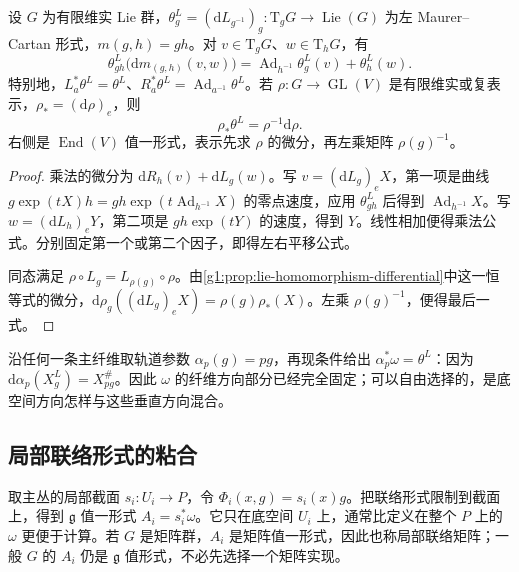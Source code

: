 \begin{proposition}\label{g1:prop:maurer-cartan-product}
	设 \(G\) 为有限维实 Lie 群，\(\theta^L_g=(\mathrm{d}L_{g^{-1}})_g:\mathrm{T}_gG\to\operatorname{Lie}(G)\) 为左 Maurer--Cartan 形式，\(m(g,h)=gh\)。对 \(v\in \mathrm{T}_gG\)、\(w\in \mathrm{T}_hG\)，有
	\begin{equation}\label{g1:eq:maurer-cartan-product}
		\theta^L_{gh}\bigl(\mathrm{d}m_{(g,h)}(v,w)\bigr)
		=\operatorname{Ad}_{h^{-1}}\theta^L_g(v)+\theta^L_h(w).
	\end{equation}
	特别地，\(L_a^*\theta^L=\theta^L\)、\(R_a^*\theta^L=\operatorname{Ad}_{a^{-1}}\theta^L\)。若 \(\rho:G\to\operatorname{GL}(V)\) 是有限维实或复表示，\(\rho_*=(\mathrm{d}\rho)_e\)，则
	\begin{equation}\label{g1:eq:maurer-cartan-representation}
		\rho_*\theta^L=\rho^{-1}\mathrm{d}\rho.
	\end{equation}
	右侧是 \(\operatorname{End}(V)\) 值一形式，表示先求 \(\rho\) 的微分，再左乘矩阵 \(\rho(g)^{-1}\)。
\end{proposition}
\begin{proof}
	乘法的微分为 \(\mathrm{d}R_h(v)+\mathrm{d}L_g(w)\)。写 \(v=(\mathrm{d}L_g)_eX\)，第一项是曲线 \(g\exp(tX)h=gh\exp(t\operatorname{Ad}_{h^{-1}}X)\) 的零点速度，应用 \(\theta^L_{gh}\) 后得到 \(\operatorname{Ad}_{h^{-1}}X\)。写 \(w=(\mathrm{d}L_h)_eY\)，第二项是 \(gh\exp(tY)\) 的速度，得到 \(Y\)。线性相加便得乘法公式。分别固定第一个或第二个因子，即得左右平移公式。

	同态满足 \(\rho\circ L_g=L_{\rho(g)}\circ\rho\)。由\cref{g1:prop:lie-homomorphism-differential}中这一恒等式的微分，\(\mathrm{d}\rho_g((\mathrm{d}L_g)_eX)=\rho(g)\rho_*(X)\)。左乘 \(\rho(g)^{-1}\)，便得最后一式。
\end{proof}

沿任何一条主纤维取轨道参数 \(\alpha_p(g)=pg\)，再现条件给出 \(\alpha_p^*\omega=\theta^L\)：因为 \(\mathrm{d}\alpha_p(X_g^L)=X_{pg}^\#\)。因此 \(\omega\) 的纤维方向部分已经完全固定；可以自由选择的，是底空间方向怎样与这些垂直方向混合。

\subsection{局部联络形式的粘合}
\label{g1:subsec:1802:03}

取主丛的局部截面 \(s_i:U_i\to P\)，令 \(\Phi_i(x,g)=s_i(x)g\)。把联络形式限制到截面上，得到 \(\mathfrak g\) 值一形式 \(A_i=s_i^*\omega\)。它只在底空间 \(U_i\) 上，通常比定义在整个 \(P\) 上的 \(\omega\) 更便于计算。若 \(G\) 是矩阵群，\(A_i\) 是矩阵值一形式，因此也称局部联络矩阵；一般 \(G\) 的 \(A_i\) 仍是 \(\mathfrak g\) 值形式，不必先选择一个矩阵实现。

